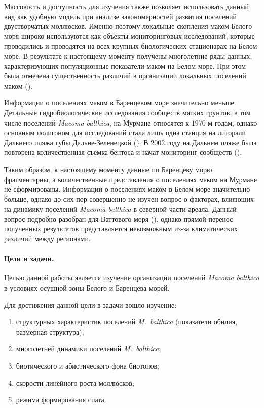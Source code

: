 Массовость и доступность для изучения также позволяет использовать данный вид как удобную модель при анализе закономерностей развития поселений двустворчатых моллюсков. 
Именно поэтому локальные скопления маком Белого моря широко используются как объекты мониторинговых исследований, которые проводились и проводятся на всех крупных биологических стационарах на Белом море. 
В результате к настоящему моменту получены многолетние ряды данных, характеризующих  популяционные показатели маком на Белом море. 
При этом была отмечена существенность различий в организации локальных поселений маком (\cite{Semenova_1974, Maximovich_Kunina_1982, Maximovich_et_al_1991, Poloskin_1996, Nikolaeva_1998, Nazarova_2003, Nazarova_Poloskin_2005}).

 
Информации о поселениях маком в Баренцевом море значительно меньше. 
Детальные гидробиологические исследования сообществ мягких грунтов, в том числе  поселений {\it Macoma balthica}, на Мурмане относятся к $1970$-м годам, однако основным полигоном для исследований стала лишь одна станция на литорали Дальнего пляжа губы Дальне-Зеленецкой (\cite{Agarova_et_al_1976}).
В $2002$ году на Дальнем пляже была повторена количественная съемка бентоса и начат мониторинг сообществ (\cite{Genelt_Dalnezeleneckaya_2008}).

Таким образом, к настоящему моменту данные по Баренцеву морю фрагментарны, а количественные представления о поселениях маком на Мурмане не сформированы. 
Информации о поселениях маком в Белом море значительно больше, однако до сих пор совершенно не изучен вопрос о факторах, влияющих на динамику поселений {\it Macoma balthica} в северной части ареала. Данный вопрос подробно разобран для Ваттового моря (\cite{Hiddink_et_al_2002_predation_epifauna, Hiddink_et_al_2002_predation_infauna, Beukema_et_al_2009}), однако прямой перенос полученных результатов представляется невозможным из-за климатических различий между регионами.
%
\paragraph{Цели и задачи.}
Целью данной работы является изучение организации поселений {\it Macoma balthica} в условиях осушной зоны Белого и Баренцева морей.

Для достижения данной цели в задачи вошло изучение:
  \begin{enumerate}
    \item структурных характеристик поселений \textit{M.~balthica} (показатели обилия, размерная структура);
    \item многолетней динамики поселений \textit{M.~balthica};
    \item биотического и абиотического фона биотопов;
    \item скорости линейного роста моллюсков;
    \item режима формирования спата.
  \end{enumerate}
%
